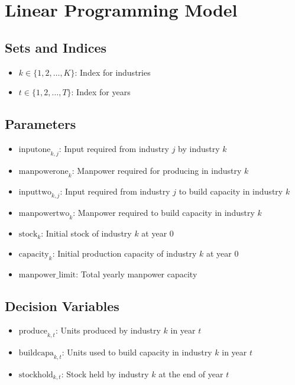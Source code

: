 \documentclass{article}
\begin{document}
\section*{Linear Programming Model}

\subsection*{Sets and Indices}
\begin{itemize}
    \item \(k \in \{1, 2, \ldots, K\}\): Index for industries
    \item \(t \in \{1, 2, \ldots, T\}\): Index for years
\end{itemize}

\subsection*{Parameters}
\begin{itemize}
    \item \(\text{inputone}_{k, j}\): Input required from industry \(j\) by industry \(k\)
    \item \(\text{manpowerone}_{k}\): Manpower required for producing in industry \(k\)
    \item \(\text{inputtwo}_{k, j}\): Input required from industry \(j\) to build capacity in industry \(k\)
    \item \(\text{manpowertwo}_{k}\): Manpower required to build capacity in industry \(k\)
    \item \(\text{stock}_{k}\): Initial stock of industry \(k\) at year 0
    \item \(\text{capacity}_{k}\): Initial production capacity of industry \(k\) at year 0
    \item \(\text{manpower\_limit}\): Total yearly manpower capacity
\end{itemize}

\subsection*{Decision Variables}
\begin{itemize}
    \item \(\text{produce}_{k,t}\): Units produced by industry \(k\) in year \(t\)
    \item \(\text{buildcapa}_{k,t}\): Units used to build capacity in industry \(k\) in year \(t\)
    \item \(\text{stockhold}_{k,t}\): Stock held by industry \(k\) at the end of year \(t\)
\end{itemize}
\end{document}
